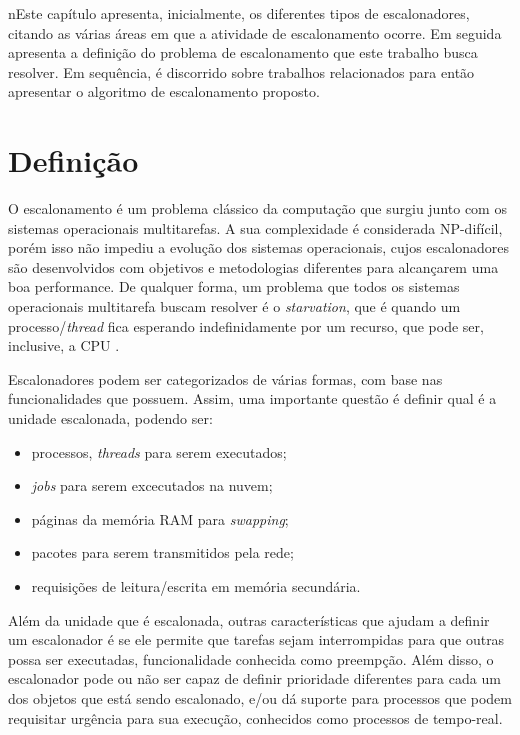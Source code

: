 nEste capítulo apresenta, inicialmente, os diferentes tipos de escalonadores, citando as várias áreas em que a atividade de escalonamento ocorre. Em seguida apresenta a definição do problema de escalonamento que este trabalho busca resolver. Em sequência, é discorrido sobre trabalhos relacionados para então apresentar o algoritmo de escalonamento proposto.

\section{Definição}

O escalonamento é um problema clássico da computação que surgiu junto com os sistemas operacionais multitarefas. A sua complexidade é considerada NP-difícil\cite{ULLMAN1975384}, porém isso não impediu a evolução dos sistemas operacionais, cujos escalonadores são desenvolvidos com objetivos e metodologias diferentes para alcançarem uma boa performance. De qualquer forma, um problema que todos os sistemas operacionais multitarefa buscam resolver é o \textit{starvation}, que é quando um processo/\textit{thread} fica esperando indefinidamente por um recurso, que pode ser, inclusive, a \acrshort{CPU} \cite{TANEMBAUM_SO}.

Escalonadores podem ser categorizados de várias formas, com base nas funcionalidades que possuem. Assim, uma importante questão é definir qual é a unidade escalonada, podendo ser\cite{TANEMBAUM_SO}:

	\begin{itemize}
		\item processos, \textit{threads} para serem executados;
		\item \textit{jobs} para serem excecutados na nuvem;
		\item páginas da memória \acrfull{RAM} para \textit{swapping};
		\item pacotes para serem transmitidos pela rede;
		\item requisições de leitura/escrita em memória secundária.
	\end{itemize}

	Além da unidade que é escalonada, outras características que ajudam a definir um escalonador é se ele permite que tarefas sejam interrompidas para que outras possa ser executadas, funcionalidade conhecida como preempção. Além disso, o escalonador pode ou não ser capaz de definir prioridade diferentes para cada um dos objetos que está sendo escalonado, e/ou dá suporte para processos que podem requisitar urgência para sua execução, conhecidos como processos de tempo-real\cite{TANEMBAUM_SO}.

